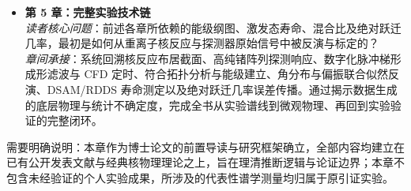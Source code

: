 \begin{itemize}
    \item \textbf{第 5 章：完整实验技术链}\\
    \textit{读者核心问题}：前述各章所依赖的能级纲图、激发态寿命、混合比及绝对跃迁几率，最初是如何从重离子核反应与探测器原始信号中被反演与标定的？\\
    \textit{章间承接}：系统回溯核反应布居截面、高纯锗阵列探测响应、数字化脉冲梯形成形滤波与 CFD 定时、符合拓扑分析与能级建立、角分布与偏振联合似然反演、DSAM/RDDS 寿命测定以及绝对跃迁几率误差传播。通过揭示数据生成的底层物理与统计不确定度，完成全书从实验谱线到微观物理、再回到实验验证的完整闭环。
\end{itemize}

需要明确说明：本章作为博士论文的前置导读与研究框架确立，全部内容均建立在已有公开发表文献与经典核物理理论之上，旨在理清推断逻辑与论证边界；本章不包含未经验证的个人实验成果，所涉及的代表性谱学测量均归属于原引证实验。
